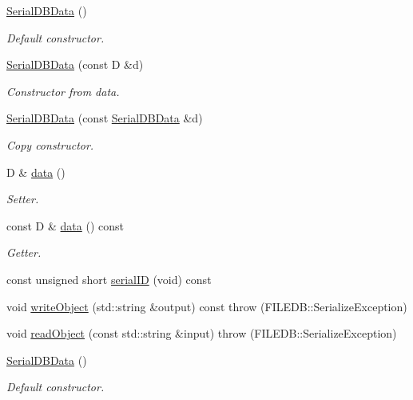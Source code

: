 \begin{DoxyCompactItemize}
\item 
\mbox{\hyperlink{classADATIO_1_1SerialDBData_a07279a443371f31d9e0ef857fab17fa5}{Serial\+D\+B\+Data}} ()
\begin{DoxyCompactList}\small\item\em Default constructor. \end{DoxyCompactList}\item 
\mbox{\hyperlink{classADATIO_1_1SerialDBData_afe5b91aca4221cfce681c85498a46f0c}{Serial\+D\+B\+Data}} (const D \&d)
\begin{DoxyCompactList}\small\item\em Constructor from data. \end{DoxyCompactList}\item 
\mbox{\hyperlink{classADATIO_1_1SerialDBData_a740c06f0022817ca9c071d186d7b3e92}{Serial\+D\+B\+Data}} (const \mbox{\hyperlink{classADATIO_1_1SerialDBData}{Serial\+D\+B\+Data}} \&d)
\begin{DoxyCompactList}\small\item\em Copy constructor. \end{DoxyCompactList}\item 
D \& \mbox{\hyperlink{classADATIO_1_1SerialDBData_af4a3864baddbecbc6177f164f8a1f664}{data}} ()
\begin{DoxyCompactList}\small\item\em Setter. \end{DoxyCompactList}\item 
const D \& \mbox{\hyperlink{classADATIO_1_1SerialDBData_a5532be95ec6214348c087afd8b2ff683}{data}} () const
\begin{DoxyCompactList}\small\item\em Getter. \end{DoxyCompactList}\item 
const unsigned short \mbox{\hyperlink{classADATIO_1_1SerialDBData_a513643be38434a570d655602330aade9}{serial\+ID}} (void) const
\item 
void \mbox{\hyperlink{classADATIO_1_1SerialDBData_a5266e4f1c065f0776f9974d6fad51a2f}{write\+Object}} (std\+::string \&output) const  throw (\+F\+I\+L\+E\+D\+B\+::\+Serialize\+Exception)
\item 
void \mbox{\hyperlink{classADATIO_1_1SerialDBData_a2f7405b96f413b1787fc2072b8932c20}{read\+Object}} (const std\+::string \&input)  throw (\+F\+I\+L\+E\+D\+B\+::\+Serialize\+Exception)
\item 
\mbox{\hyperlink{classADATIO_1_1SerialDBData_a07279a443371f31d9e0ef857fab17fa5}{Serial\+D\+B\+Data}} ()
\begin{DoxyCompactList}\small\item\em Default constructor. \end{DoxyCompactList}\item 

\end{DoxyCompactItemize}
